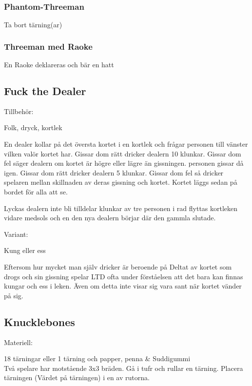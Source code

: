 \subsubsection*{Phantom-Threeman}

Ta bort tärning(ar)

\subsubsection*{Threeman med Raoke}

En Raoke deklareras och bär en hatt

\newpage

\subsection*{\textbf{Fuck the Dealer}}

Tillbehör:

Folk, dryck, kortlek

En dealer kollar på det översta kortet i en kortlek och frågar personen till vänster vilken valör kortet har. Gissar dom rätt dricker dealern 10 klunkar. Gissar dom fel säger dealern om kortet är högre eller lägre än gissningen. personen gissar då igen. Gissar dom rätt dricker dealern 5 klunkar. Gissar dom fel så dricker spelaren mellan skillnaden av deras gissning och kortet. Kortet läggs sedan på bordet för alla att se.

Lyckas dealern inte bli tilldelar klunkar av tre personen i rad flyttas kortleken vidare medsols och en den nya dealern börjar där den gammla slutade.

Variant:

Kung eller ess

Eftersom hur mycket man själv dricker är beroende på Deltat av kortet som drogs och sin gissning spelar LTD ofta under förståelsen att det bara kan finnas kungar och ess i leken. Även om detta inte visar sig vara sant när kortet vänder på sig.

\subsection*{\textbf{Knucklebones}}

Materiell:

18 tärningar eller 1 tärning och papper, penna \& Suddigummi\\

Två spelare har motstående 3x3 bräden. Gå i tufr och rullar en tärning. Placera tärningen (Värdet på tärningen) i en av rutorna.

